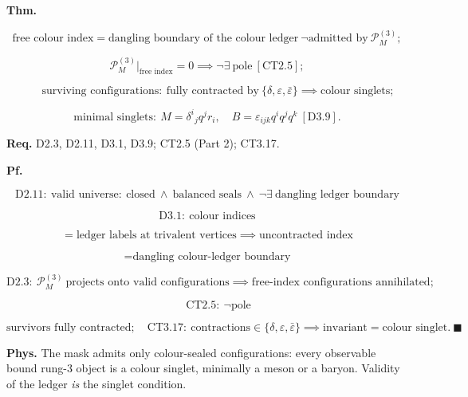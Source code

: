 \begin{theorem}\label{tag:CT3-18}
\textbf{Thm.}

\[
\text{free colour index}=\text{dangling boundary of the colour ledger}\ \neg\text{admitted by}\ \mathcal P_M^{(3)};
\]

\[
\mathcal P_M^{(3)}\big|_{\text{free index}}=0\implies\neg\exists\ \text{pole}\ [\mathrm{CT2.5}];
\]

\[
\qquad \text{surviving configurations}:\ \text{fully contracted by}\ \{\delta,\varepsilon,\bar\varepsilon\}\implies\text{colour singlets};
\]

\[
\text{minimal singlets}:\ M=\delta^i{}_jq^jr_i,\quad B=\varepsilon_{ijk}q^iq^jq^k\ [\mathrm{D3.9}].
\]

\textbf{Req.} D2.3, D2.11, D3.1, D3.9; CT2.5 (Part 2); CT3.17.

\textbf{Pf.}

\[
\mathrm{D2.11}:\ \text{valid universe}:\ \text{closed}\ \wedge\ \text{balanced seals}\ \wedge\ \neg\exists\ \text{dangling ledger boundary}
\]

\[
\mathrm{D3.1}:\ \text{colour indices}
\]

\[
= \text{ledger labels at trivalent vertices}\implies\text{uncontracted index}
\]

\[
= \text{dangling colour-ledger boundary}
\]

\[
\mathrm{D2.3}:\ \mathcal P_M^{(3)}\ \text{projects onto valid configurations}\implies\text{free-index configurations annihilated};
\]

\[
\qquad \mathrm{CT2.5}:\ \neg\text{pole}
\]

\[
\text{survivors fully contracted};\quad\mathrm{CT3.17}:\ \text{contractions}\in\{\delta,\varepsilon,\bar\varepsilon\}\implies\text{invariant}=\text{colour singlet}.\ \blacksquare
\]

\textbf{Phys.} The mask admits only colour-sealed configurations: every observable bound rung-3 object is a colour singlet, minimally a meson or a baryon. Validity of the ledger \textit{is} the singlet condition.

\end{theorem}

